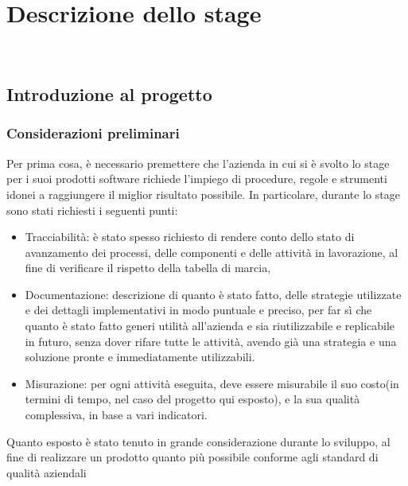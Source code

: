 
\chapter{Descrizione dello stage}
\label{cap:descrizione-stage}

\\

\section{Introduzione al progetto}
\subsection{Considerazioni preliminari}
Per prima cosa, è necessario premettere che l'azienda in cui si è svolto lo stage per i suoi prodotti software richiede l'impiego di procedure, regole e strumenti idonei a raggiungere il miglior risultato possibile.
In particolare, durante lo stage sono stati richiesti i seguenti punti:
\begin{itemize}
\item Tracciabilità: è stato spesso richiesto di rendere conto dello stato di avanzamento dei processi, delle componenti e delle attività in lavorazione, al fine di verificare il rispetto della tabella di marcia,
\item Documentazione: descrizione di quanto è stato fatto, delle strategie utilizzate e dei dettagli implementativi in modo puntuale e preciso, per far sì che quanto è stato fatto generi utilità all'azienda e sia riutilizzabile e replicabile in futuro, senza dover rifare tutte le attività, avendo già una strategia e una soluzione pronte e immediatamente utilizzabili.
\item Misurazione: per ogni attività eseguita, deve essere misurabile il suo costo(in termini di tempo, nel caso del progetto qui esposto), e la sua qualità complessiva, in base a vari indicatori.
\end{itemize}
Quanto esposto è stato tenuto in grande considerazione durante lo sviluppo, al fine di realizzare un prodotto quanto più possibile conforme agli standard di qualità aziendali
